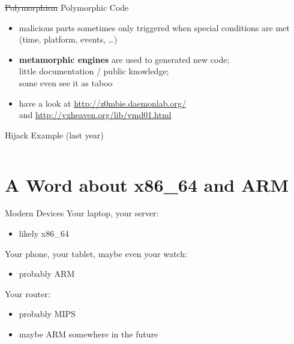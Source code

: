 \documentclass[beamer]{uibk}
\begin{document}
\begin{frame}{\st{Polymorphism} Polymorphic Code}
    \begin{itemize}
        \item malicious parts sometimes only triggered when special conditions
            are met (time, platform, events, \dots)
        \medskip
        \pause
        \item \textbf{metamorphic engines} are used to generated new code;\\
            little documentation / public knowledge;\\
            some even see it as taboo
        \medskip
        \pause
        \item have a look at \url{http://z0mbie.daemonlab.org/}\\
            and \url{http://vxheaven.org/lib/vmd01.html}
    \end{itemize}
\end{frame}

\begin{frame}[t,fragile]{Hijack Example (last year)}
    \begin{columns}
        \begin{column}{0.75\textwidth}
        \end{column}
        \begin{column}{0.25\textwidth}
        \end{column}
    \end{columns}
\end{frame}

\section{A Word about x86\_64 and ARM}

\begin{frame}{Modern Devices}
    Your laptop, your server:
    \begin{itemize}
        \item likely x86\_64
    \end{itemize}
    \medskip
    \pause
    Your phone, your tablet, maybe even your watch:
    \begin{itemize}
        \item probably ARM
    \end{itemize}
    \medskip
    \pause
    Your router:
    \begin{itemize}
        \item probably MIPS
        \item maybe ARM somewhere in the future
    \end{itemize}
\end{frame}
\end{document}
